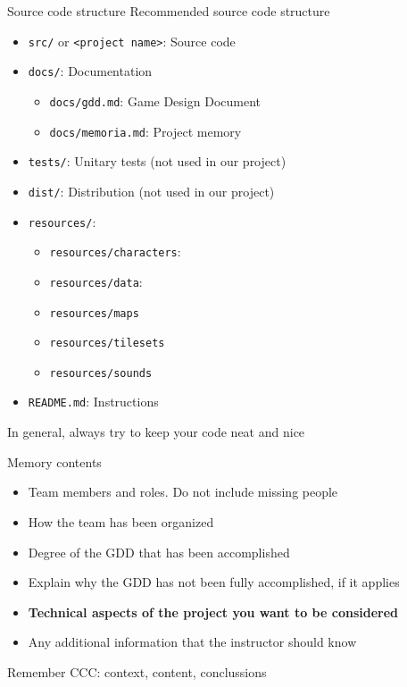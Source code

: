 \documentclass[10pt,compress]{beamer} %
\begin{document}
\begin{frame}{Source code structure}
	Recommended source code structure
	\begin{itemize}
	\item \texttt{src/} or \texttt{<project name>}: Source code
	\item \texttt{docs/}: Documentation
		\begin{itemize}
		\item \texttt{docs/gdd.md}: Game Design Document
		\item \texttt{docs/memoria.md}: Project memory
		\end{itemize}
	\item \texttt{tests/}: Unitary tests (not used in our project)
	\item \texttt{dist/}: Distribution (not used in our project)
	\item \texttt{resources/}:
		\begin{itemize}
		\item \texttt{resources/characters}:
		\item \texttt{resources/data}:
		\item \texttt{resources/maps}
		\item \texttt{resources/tilesets}
		\item \texttt{resources/sounds}
		\end{itemize}
    \item \texttt{README.md}: Instructions
	\end{itemize}
   In general, always try to keep your code neat and nice
\end{frame}

\begin{frame}{Memory contents}
	\begin{itemize}
	\item Team members and roles. Do not include missing people
	\item How the team has been organized
	\item Degree of the GDD that has been accomplished
	\item Explain why the GDD has not been fully accomplished, if it applies
    \item \textbf{Technical aspects of the project you want to be considered}
    \item Any additional information that the instructor should know
	\end{itemize}
    Remember CCC: context, content, conclussions
\end{frame}
\end{document}
